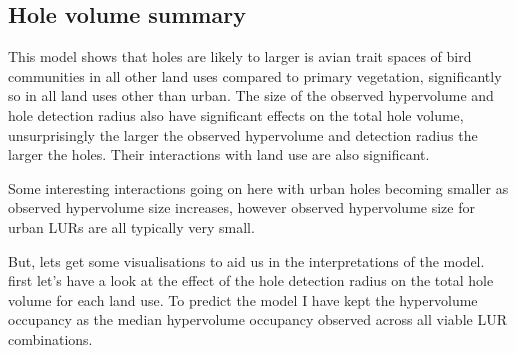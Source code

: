 \documentclass[
]{article}
\begin{document}
\hypertarget{hole-volume-summary}{%
\subsection{Hole volume summary}\label{hole-volume-summary}}

This model shows that holes are likely to larger is avian trait spaces
of bird communities in all other land uses compared to primary
vegetation, significantly so in all land uses other than urban. The size
of the observed hypervolume and hole detection radius also have
significant effects on the total hole volume, unsurprisingly the larger
the observed hypervolume and detection radius the larger the holes.
Their interactions with land use are also significant.

Some interesting interactions going on here with urban holes becoming
smaller as observed hypervolume size increases, however observed
hypervolume size for urban LURs are all typically very small.

But, lets get some visualisations to aid us in the interpretations of
the model. first let's have a look at the effect of the hole detection
radius on the total hole volume for each land use. To predict the model
I have kept the hypervolume occupancy as the median hypervolume
occupancy observed across all viable LUR combinations.
\end{document}
